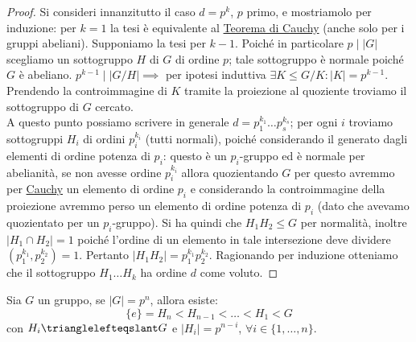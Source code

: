 \documentclass[11pt]{scrartcl}
\begin{document}
\begin{proof}
    Si consideri innanzitutto il caso $d=p^k$, $p$ primo, e mostriamolo per induzione:
    per $k=1$ la tesi è equivalente al \hyperref[p:Cauchy]{Teorema di Cauchy} (anche solo per i gruppi abeliani).
    Supponiamo la tesi per $k-1$. Poiché in particolare $p\mid |G|$ scegliamo un sottogruppo $H$ di $G$ di ordine $p$;
    tale sottogruppo è normale poiché $G$ è abeliano. $p^{k-1}\mid |G/H|\implies$ per ipotesi induttiva $\exists K \leqslant G/K : |K|=p^{k-1}$. \\
    Prendendo la controimmagine di $K$ tramite la proiezione al quoziente troviamo il sottogruppo di $G$ cercato. \\
    A questo punto possiamo scrivere in generale $d=p_1^{k_1}\ldots p_s^{k_s}$; per ogni $i$ troviamo sottogruppi $H_i$ di ordini $p_i^{k_i}$ (tutti normali), poiché considerando il generato dagli elementi di ordine potenza di $p_i$:
    questo è un $p_i$-gruppo ed è normale per abelianità, se non avesse ordine $p_i^{k_i}$ allora quozientando $G$ per questo avremmo per \hyperref[Cauchy]{Cauchy} un elemento di ordine $p_i$ e considerando la controimmagine della proiezione avremmo
    perso un elemento di ordine potenza di $p_i$ (dato che avevamo quozientato per un $p_i$-gruppo). Si ha quindi che $H_1H_2\leqslant G$ per normalità,
    inoltre $|H_1\cap H_2|=1$ poiché l'ordine di un elemento in tale intersezione deve dividere $(p_1^{k_1}, p_2^{k_2})=1$. Pertanto $|H_1H_2|=p_1^{k_1}p_2^{k_2}$.
    Ragionando per induzione otteniamo che il sottogruppo $H_1\ldots H_k$ ha ordine $d$ come voluto.
\end{proof}

\begin{exercise}
    Sia $G$ un gruppo, se $|G| = p^n$, allora esiste:
        \[ \{e\} = H_n < H_{n-1} < \ldots < H_1 < G
            \]
    con $H_i \trianglelefteqslant G$ e $|H_i| = p^{n-i}$, $\forall i \in \{1,\ldots,n\}$.
\end{exercise}
\end{document}
